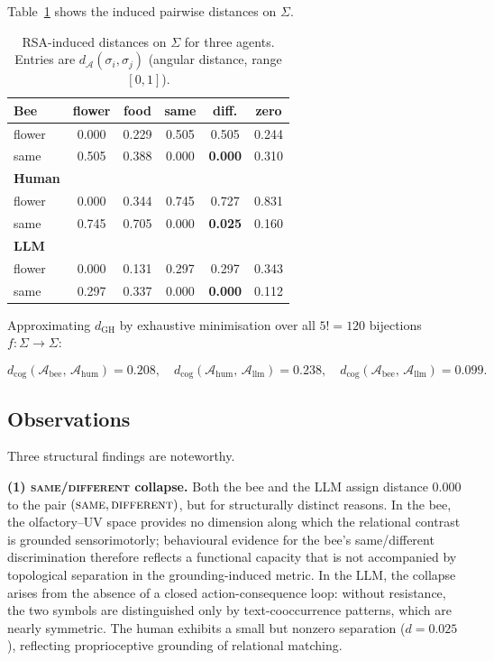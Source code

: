 Table~\ref{tab:dist} shows the induced pairwise distances on $\Sigma$.

\begin{table}[ht]
\centering
\small
\caption{RSA-induced distances on $\Sigma$ for three agents.
Entries are $d_{\mathcal{A}}(\sigma_i,\sigma_j)$ (angular distance,
range $[0,1]$).}
\label{tab:dist}
\begin{tabular}{l|ccccc}
\hline
\textbf{Bee} & flower & food & same & diff. & zero \\
\hline
flower    & 0.000 & 0.229 & 0.505 & 0.505 & 0.244 \\
same      & 0.505 & 0.388 & 0.000 & \textbf{0.000} & 0.310 \\
\hline
\textbf{Human} & & & & & \\
\hline
flower    & 0.000 & 0.344 & 0.745 & 0.727 & 0.831 \\
same      & 0.745 & 0.705 & 0.000 & \textbf{0.025} & 0.160 \\
\hline
\textbf{LLM} & & & & & \\
\hline
flower    & 0.000 & 0.131 & 0.297 & 0.297 & 0.343 \\
same      & 0.297 & 0.337 & 0.000 & \textbf{0.000} & 0.112 \\
\hline
\end{tabular}
\end{table}

Approximating $d_{\mathrm{GH}}$ by exhaustive minimisation over all
$5! = 120$ bijections $f: \Sigma \to \Sigma$:

\[
d_{\mathrm{cog}}(\mathcal{A}_{\mathrm{bee}},\,\mathcal{A}_{\mathrm{hum}})
  = 0.208, \quad
d_{\mathrm{cog}}(\mathcal{A}_{\mathrm{hum}},\,\mathcal{A}_{\mathrm{llm}})
  = 0.238, \quad
d_{\mathrm{cog}}(\mathcal{A}_{\mathrm{bee}},\,\mathcal{A}_{\mathrm{llm}})
  = 0.099.
\]

\subsection*{Observations}

Three structural findings are noteworthy.

\textbf{(1) \textsc{same}/\textsc{different} collapse.}
Both the bee and the LLM assign distance $0.000$ to the pair
$(\textsc{same}, \textsc{different})$, but for structurally distinct
reasons. In the bee, the olfactory--UV space provides no dimension along
which the relational contrast is grounded sensorimotorly; behavioural
evidence for the bee's same/different discrimination
\cite{giurfa2001} therefore reflects a functional capacity that is not
accompanied by topological separation in the grounding-induced metric.
In the LLM, the collapse arises from the absence of a closed
action-consequence loop: without resistance, the two symbols are
distinguished only by text-cooccurrence patterns, which are nearly
symmetric. The human exhibits a small but nonzero separation
($d = 0.025$), reflecting proprioceptive grounding of relational
matching.

